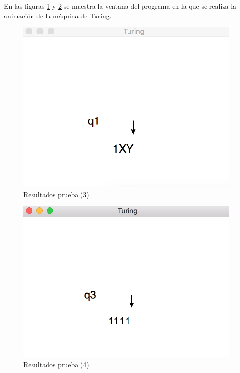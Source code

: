 	En las figuras \ref{fig:maquin4} y \ref{fig:maquina5} se muestra la ventana del programa en la que se realiza la animación de la máquina de Turing.
	\begin{figure}[H]
		\begin{center}
			\includegraphics[scale=.7]{MT/img/prueba3.png}
			\caption{Resultados prueba (3)}
			\label{fig:maquin4}
		\end{center}
	\end{figure}
	\begin{figure}[H]
		\begin{center}
			\includegraphics[scale=.7]{MT/img/prueba4.png}
			\caption{Resultados prueba (4)}
			\label{fig:maquina5}
		\end{center}
	\end{figure}

